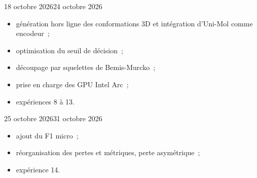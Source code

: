 \begin{fichesuivi}{18 octobre 2026}{24 octobre 2026}

   \begin{travaileffectue}
      \begin{itemize}
         \item génération hors ligne des conformations 3D et intégration d'Uni-Mol comme encodeur~;
         \item optimisation du seuil de décision~;
         \item découpage par squelettes de Bemis-Murcko~;
         \item prise en charge des GPU Intel Arc~;
         \item expériences 8 à 13.
      \end{itemize}
   \end{travaileffectue}

   \begin{travailnoneffectue}
   \end{travailnoneffectue}

   \begin{echange}
   \end{echange}

   \begin{planification}
   \end{planification}
\end{fichesuivi}

\begin{fichesuivi}{25 octobre 2026}{31 octobre 2026}

   \begin{travaileffectue}
      \begin{itemize}
         \item ajout du F1 micro~;
         \item réorganisation des pertes et métriques, perte asymétrique~;
         \item expérience 14.
      \end{itemize}
   \end{travaileffectue}

   \begin{travailnoneffectue}
   \end{travailnoneffectue}

   \begin{echange}
   \end{echange}

   \begin{planification}
   \end{planification}
\end{fichesuivi}

